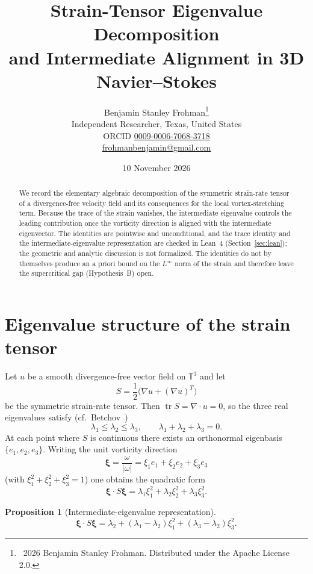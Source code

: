 \documentclass[11pt,a4paper]{article}
\title{Strain-Tensor Eigenvalue Decomposition\\and Intermediate Alignment in 3D Navier--Stokes}
\author{Benjamin Stanley Frohman\thanks{\textcopyright\ 2026 Benjamin Stanley Frohman. Distributed under the Apache License 2.0.}\\\small Independent Researcher, Texas, United States\\\small ORCID \href{https://orcid.org/0009-0006-7068-3718}{0009-0006-7068-3718}\\\small \href{mailto:frohmanbenjamin@gmail.com}{frohmanbenjamin@gmail.com}}
\date{10 November 2026}
\newtheorem{proposition}[theorem]{Proposition}
\begin{document}
\maketitle

\begin{abstract}
We record the elementary algebraic decomposition of the symmetric strain-rate tensor of a divergence-free velocity field and its consequences for the local vortex-stretching term. Because the trace of the strain vanishes, the intermediate eigenvalue controls the leading contribution once the vorticity direction is aligned with the intermediate eigenvector. The identities are pointwise and unconditional, and the trace identity and the intermediate-eigenvalue representation are checked in Lean~4 (Section~\ref{sec:lean}); the geometric and analytic discussion is not formalized. The identities do not by themselves produce an a priori bound on the \(L^\infty\) norm of the strain and therefore leave the supercritical gap (Hypothesis~B) open.
\end{abstract}

\section{Eigenvalue structure of the strain tensor}

Let \(u\) be a smooth divergence-free vector field on \(\mathbb{T}^3\) and let
\[
S=\frac12\bigl(\nabla u+(\nabla u)^T\bigr)
\]
be the symmetric strain-rate tensor. Then \(\operatorname{tr}S=\nabla\cdot u=0\), so the three real eigenvalues satisfy (cf.\ Betchov~\cite{Betchov1956})
\begin{equation}\label{eq:trace}
\lambda_1\le\lambda_2\le\lambda_3,\qquad\lambda_1+\lambda_2+\lambda_3=0.
\end{equation}
At each point where \(S\) is continuous there exists an orthonormal eigenbasis \(\{e_1,e_2,e_3\}\). Writing the unit vorticity direction
\[
\boldsymbol{\xi}=\frac{\omega}{|\omega|}=\xi_1 e_1+\xi_2 e_2+\xi_3 e_3
\]
(with \(\xi_1^2+\xi_2^2+\xi_3^2=1\)) one obtains the quadratic form
\begin{equation}\label{eq:quadratic}
\boldsymbol{\xi}\cdot S\boldsymbol{\xi}=\lambda_1\xi_1^2+\lambda_2\xi_2^2+\lambda_3\xi_3^2.
\end{equation}

\begin{proposition}[Intermediate-eigenvalue representation]
\[
\boldsymbol{\xi}\cdot S\boldsymbol{\xi}
=\lambda_2+(\lambda_1-\lambda_2)\xi_1^2+(\lambda_3-\lambda_2)\xi_3^2.
\]
\end{proposition}
\end{document}
